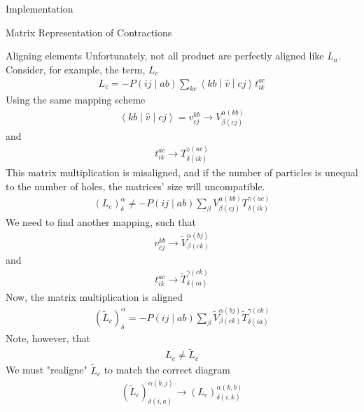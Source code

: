 \documentclass[twoside,english]{uiofysmaster}
\begin{document}
\begin{chapter}{Implementation}
\begin{section}{Matrix Representation of Contractions}
		\begin{subsection}{Aligning elements}	
			Unfortunately, not all product are perfectly aligned like $L_a$. Consider, for example, the term, $L_c$
			\begin{align}
				L_c = -P\left(ij\middle|ab\right) \sum_{kc} \left<kb\middle|\hat v\middle|cj\right>t_{ik}^{ac}
			\end{align}
			Using the same mapping scheme
			\begin{align}
				\left<kb\middle|\hat v\middle|cj\right> = v_{cj}^{kb} \rightarrow V_{\beta(cj)}^{\alpha(kb)}
			\end{align}
			and
			\begin{align}
				t_{ik}^{ac} \rightarrow T_{\delta(ik)}^{\gamma(ac)}
			\end{align}
			This matrix multiplication is misaligned, and if the number of particles is unequal to the number of holes, the matrices' size will uncompatible. 
			\begin{align}
				(L_c)_ \delta^\alpha \neq -P\left(ij\middle|ab\right) \sum_ \beta V_{\beta(cj)}^{\alpha(kb)} T_{\delta(ik)}^{\gamma(ac)}
			\end{align}
			We need to find another mapping, such that
			\begin{align}
				v_{cj}^{kb} \rightarrow \tilde V_{\beta(ck)}^{\alpha(bj)}
			\end{align}
			and 
			\begin{align}
				t_{ik}^{ac} \rightarrow \tilde T_{\delta(ia)}^{\gamma(ck)}
			\end{align}
			Now, the matrix multiplication is aligned
			\begin{align}
				(\tilde L_c)_ \delta^\alpha = -P\left(ij\middle|ab\right) \sum_ \beta \tilde V_{\beta(ck)}^{\alpha(bj)} \tilde T_{\delta(ia)}^{\gamma(ck)}
			\end{align}
			Note, however, that 
			\begin{align}
				L_c \neq \tilde L_c
			\end{align}
			We must "realigne" $\tilde L_c$ to match the correct diagram
			\begin{align}
				(\tilde L_c)_{\delta(i,a)}^{\alpha(b,j)} \rightarrow (L_c)_{\delta(i,k)}^{\alpha(k,b)}
			\end{align}
		\end{subsection}

	\end{section}


\end{chapter}
\end{document}
